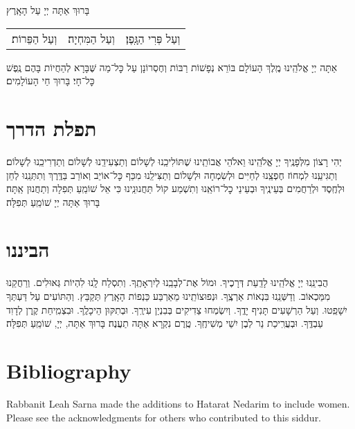 \documentclass[twoside, openany, parskip=half, 11pt]{book}
\begin{document}
בָּרוּךְ אַתָּה יְיָ עַל הָאָֽרֶץ

\begin{tabular}{c|c|c}
וְעַל הַפֵּרוֹת׃ & וְעַל הַמִּחְיָה׃ & וְעַל פְּרִי הַגָּֽפֶן׃
\end{tabular}
\medskip

\sepline

\vspace{\baselineskip}

אַתָּה יְיָ אֱלֹהֵֽינוּ מֶֽלֶךְ הָעוֹלָם בּוֹרֵא נְפָשׁוֹת רַבּוֹת וְחֶסְרוֹנָן
עַל כׇּל־מַה שֶּׁבָּרָא לְהַחֲיוֹת בָּהֶם נֶֽפֶשׁ כׇּל־חָי׃ בָּרוּךְ חַי הָעוֹלָמִים׃


\chapter[תפלת הדרך]{ תפלת הדרך }

יְהִי רָצוֹן מִלְּפָנֶֽיךָ יְיָ אֱלֹהֵֽינוּ וֵאלֹהֵי אֲבוֹתֵֽינוּ שֶׁתּוֹלִיכֵֽנוּ לְשָׁלוֹם וְתַצְעִידֵֽנוּ לְשָׁלוֹם וְתַדְרִיכֵֽנוּ לְשָׁלוֹם׃ וְתַגִּיעֵֽנוּ לִמְחוֹז חֶפְצֵֽנוּ לְחַיִּים וּלְשִׂמְחָה וּלְשָׁלוֹם וְתַצִּילֵֽנוּ מִכַּף כׇּל־אוֹיֵב וְאוֹרֵב בַּדֶּֽרֶךְ וְתִתְּנֵֽנוּ לְחֵן וּלְחֶֽסֶד וּלְרַחֲמִים בְּעֵינֶֽיךָ וּבְעֵינֵי כׇל־רוֹאֵֽנוּ וְתִשְׁמַע קוֹל תַּחֲנוּנֵֽינוּ כִּי אֵל שׁוֹמֵֽעַ תְּפִלָה וְתַחֲנוּן אַֽתָּה׃ בָּרוּךְ אַתָּה יְיָ שׁוֹמֵֽעַ תְּפִלָּה׃\\
\chapter[הביננו]{ הביננו }


הֲבִינֵֽנוּ יְיָ אֱלֹהֵֽינוּ לָדַֽעַת דְּרָכֶיךָ. וּמוֹל אֶת־לְבָבֵֽנוּ לְיִרְאָתֶֽךָ. וְתִסְלַח לָֽנוּ לִהְיוֹת גְּאוּלִים. וְרַחֲקֵנוּ מִמַּכְאוֹב. וְדַשְּׁנֵֽנוּ בִּנְאוֹת אַרְצֶֽךָ. וּנְפוּצוֹתֵֽינוּ מֵאַרְבַּע כַּנְפוֹת הָאָֽרֶץ תְּקַבֵּץ. וְהַתּוֹעִים עַל דַּעְתְּךָ יִשָׁפֵֽטוּ. וְעַל הַרְשָׁעִים תָּנִיף יָדֶֽךָ. וְיִשְׂמְחוּ צַדִיקִים בְּבִנְיַן עִירֶֽךָ. וּבְתִקּוּן הֵיכָלֶֽךָ. וּבִצְמִֽיחַת קֶֽרֶן לְדָוִד עַבְדֶּֽךָ. וּבְעֲרִֽיכַת נֵר לְבֶן יִשַׁי מְשִׁיחֶֽךָ. טֶֽרֶם נִקְרָא אַתָּה תַעֲנֶה׃ בָּרוּךְ אַתָּה, יְיָ, שׁוֹמֵֽעַ תְּפִלָּה׃

\chapter{Bibliography}
\begin{english}
\nocite{artcant}
\nocite{artscroll}
\nocite{avodasyisroel}
\nocite{birnbaum}
\nocite{korenyt}
\nocite{mapm}
\nocite{olastamid}
\nocite{levshalem}
\nocite{sacks_koren_2016}
\nocite{simshalom}
\nocite{simshalomweekday}
\nocite{tefillatyesharim}
\nocite{birkat_haminim}
\nocite{albeck_kodashim}

\printbibliography
Rabbanit Leah Sarna made the additions to Hatarat Nedarim to include women. Please see the acknowledgments for others who contributed to this siddur.

\end{english}

\end{document}
